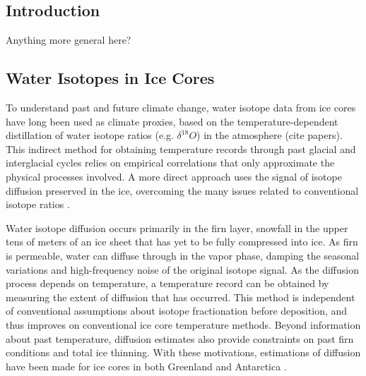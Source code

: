 \documentclass[draft, jgrga]{AGUTeX}
\begin{document}


\begin{article}

\section{Introduction}

Anything more general here?

\subsection{Water Isotopes in Ice Cores}

To understand past and future climate change, water isotope data from ice cores have long been used as climate proxies, based on the temperature-dependent distillation of water isotope ratios (e.g. $\delta ^{18}O$) in the atmosphere (cite papers). This indirect method for obtaining temperature records through past glacial and interglacial cycles relies on empirical correlations that only approximate the physical processes involved. A more direct approach uses the signal of isotope diffusion preserved in the ice, overcoming the many issues related to conventional
isotope ratios \citep{Johnsen2000}.

Water isotope diffusion occurs primarily in the firn layer, snowfall in the upper tens of meters of an ice sheet that has yet to be fully compressed into ice. As firn is permeable, water can diffuse through in the vapor phase, damping the seasonal variations and high-frequency noise of the original isotope signal. As the diffusion process depends on temperature, a temperature record can be obtained by measuring the extent of diffusion that has occurred. This method is independent of conventional assumptions about isotope fractionation before deposition, and thus improves on conventional ice core temperature methods. Beyond information about past temperature, diffusion estimates also provide constraints on past firn conditions and total ice thinning. With these motivations, estimations of diffusion have been made for ice cores in both Greenland and Antarctica \citep{Johnsen2000,Simonsen2011,Gkinis2014,Jones2016}.


\end{article}
\end{document}
